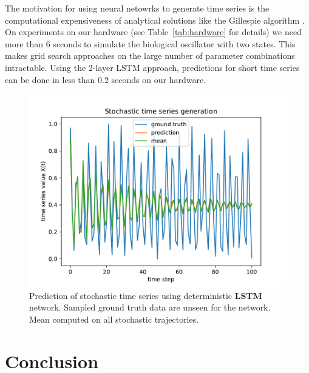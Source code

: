 \documentclass{article}
\begin{document}
The motivation for using neural netowrks to generate time series is the 
computational expensiveness of analytical solutions like the Gillespie 
algorithm \cite{gillespie1977}. On experiments on our hardware 
(see Table~\ref{tab:hardware} for details) 
we need more than 6 seconds to simulate the biological oscillator with two
states. This makes grid search approaches on the large number of parameter 
combinations intractable. Using the 2-layer LSTM approach, predictions for 
short time series can be done in less than $0.2$ seconds on our hardware.

\begin{figure}
  \centering
  \includegraphics[width=\textwidth]{figures/nn_limitation.pdf}
  \caption{Prediction of stochastic time series using deterministic 
  \textbf{LSTM} network. Sampled ground truth data are unseen for the network.
  Mean computed on all stochastic trajectories.}
  \label{fig:nn_limitation}
\end{figure}

\section{Conclusion}



\end{document}
